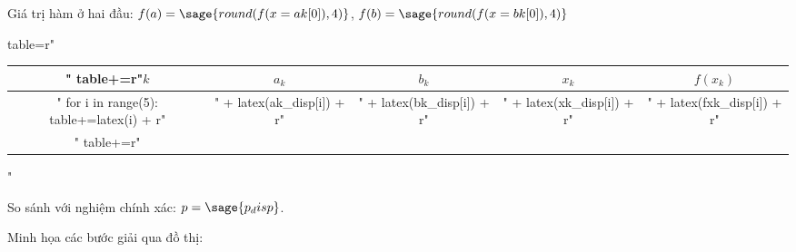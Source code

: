 \documentclass[12pt]{article}
\begin{document}
Giá trị hàm ở hai đầu: $f(a)=\sage{round(f(x=ak[0]),4)}$, $f(b)=\sage{round(f(x=bk[0]),4)}$

\begin{sagesilent}
table=r"\begin{tabular}{ccccc}"
table+=r"$k$ & $a_k$ & $b_k$ & $x_k$ & $f(x_k)$ \\ \hline"
for i in range(5):
  table+=latex(i) + r"&" + latex(ak_disp[i]) + r"&" + latex(bk_disp[i]) + r"&" + latex(xk_disp[i]) + r"&" + latex(fxk_disp[i]) + r"\\"
table+=r"\end{tabular}"
\end{sagesilent}





So sánh với nghiệm chính xác: $p = \sage{p_disp}$.


% 

\newpage{}

Minh họa các bước giải qua đồ thị:

\end{document}
